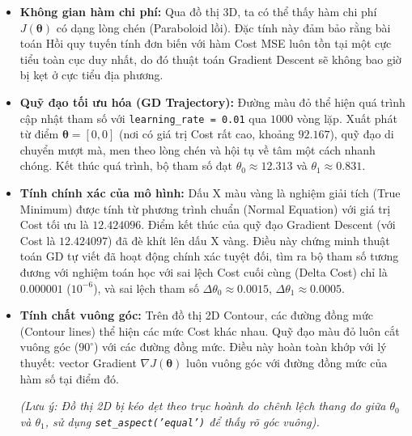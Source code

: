 \begin{itemize}
    \item \textbf{Không gian hàm chi phí:} Qua đồ thị 3D, ta có thể thấy hàm chi phí \(J(\boldsymbol{\theta})\) có dạng lòng chén (Paraboloid lồi). Đặc tính này đảm bảo rằng bài toán Hồi quy tuyến tính đơn biến với hàm Cost MSE luôn tồn tại một cực tiểu toàn cục duy nhất, do đó thuật toán Gradient Descent sẽ không bao giờ bị kẹt ở cực tiểu địa phương.
    
    \item \textbf{Quỹ đạo tối ưu hóa (GD Trajectory):} Đường màu đỏ thể hiện quá trình cập nhật tham số với \texttt{learning\_rate = 0.01} qua \(1000\) vòng lặp. Xuất phát từ điểm \(\boldsymbol{\theta} = [0,0]\) (nơi có giá trị Cost rất cao, khoảng \(92.167\)), quỹ đạo di chuyển mượt mà, men theo lòng chén và hội tụ về tâm một cách nhanh chóng. Kết thúc quá trình, bộ tham số đạt \(\theta_0 \approx 12.313\) và \(\theta_1 \approx 0.831\).
    
    \item \textbf{Tính chính xác của mô hình:} Dấu X màu vàng là nghiệm giải tích (True Minimum) được tính từ phương trình chuẩn (Normal Equation) với giá trị Cost tối ưu là \(12.424096\). Điểm kết thúc của quỹ đạo Gradient Descent (với Cost là \(12.424097\)) đã đè khít lên dấu X vàng. Điều này chứng minh thuật toán GD tự viết đã hoạt động chính xác tuyệt đối, tìm ra bộ tham số tương đương với nghiệm toán học với sai lệch Cost cuối cùng (Delta Cost) chỉ là \(0.000001\) (\(10^{-6}\)), và sai lệch tham số \(\Delta\theta_0 \approx 0.0015\), \(\Delta\theta_1 \approx 0.0005\).
    
    \item \textbf{Tính chất vuông góc:} Trên đồ thị 2D Contour, các đường đồng mức (Contour lines) thể hiện các mức Cost khác nhau. Quỹ đạo màu đỏ luôn cắt vuông góc (\(90^\circ\)) với các đường đồng mức. Điều này hoàn toàn khớp với lý thuyết: vector Gradient \(\nabla J(\boldsymbol{\theta})\) luôn vuông góc với đường đồng mức của hàm số tại điểm đó. 
    
    \textit{(Lưu ý: Đồ thị 2D bị kéo dẹt theo trục hoành do chênh lệch thang đo giữa \(\theta_0\) và \(\theta_1\), sử dụng \texttt{set\_aspect('equal')} để thấy rõ góc vuông).}
\end{itemize}